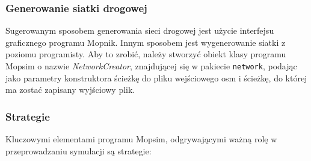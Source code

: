 \subsubsection{Generowanie siatki drogowej}
Sugerowanym sposobem generowania sieci drogowej jest użycie interfejsu graficznego programu Mopnik. Innym sposobem jest wygenerowanie siatki z poziomu programisty. Aby to zrobić, należy stworzyć obiekt klasy programu Mopsim o nazwie \textit{NetworkCreator}, znajdującej się w pakiecie \texttt{network}, podając jako parametry konstruktora ścieżkę do pliku wejściowego osm i ścieżkę, do której ma zostać zapisany wyjściowy plik.
\subsubsection{Strategie}
Kluczowymi elementami programu Mopsim, odgrywającymi ważną rolę w przeprowadzaniu symulacji są strategie:
